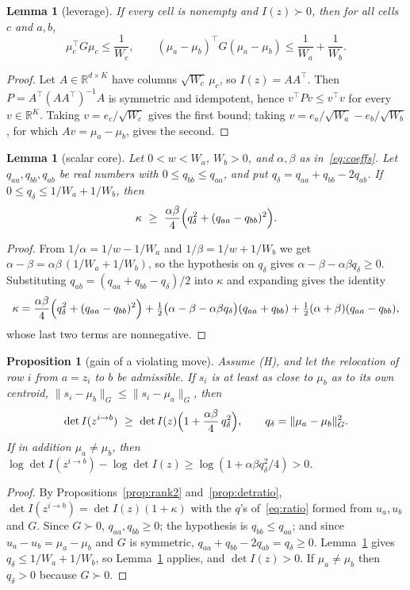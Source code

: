 \documentclass[11pt]{amsart}
\newtheorem{proposition}[theorem]{Proposition}
\newtheorem{lemma}[theorem]{Lemma}
\theoremstyle{definition}
\theoremstyle{remark}
\newcommand{\R}{\mathbb{R}}
\newcommand{\T}{^{\top}}
\newcommand{\Ib}{I(z)}
\begin{document}
\begin{lemma}[leverage]\label{lem:leverage}
If every cell is nonempty and $\Ib\succ0$, then for all cells $c$ and $a,b$,
\[
\mu_c\T G\mu_c\le\frac1{W_c},\qquad (\mu_a-\mu_b)\T G(\mu_a-\mu_b)\le\frac1{W_a}+\frac1{W_b}.
\]
\end{lemma}

\begin{proof}
Let $A\in\R^{d\times K}$ have columns $\sqrt{W_c}\,\mu_c$, so $\Ib=AA\T$. Then
$P=A\T(AA\T)^{-1}A$ is symmetric and idempotent, hence $v\T Pv\le v\T v$ for every
$v\in\R^K$. Taking $v=e_c/\sqrt{W_c}$ gives the first bound; taking
$v=e_a/\sqrt{W_a}-e_b/\sqrt{W_b}$, for which $Av=\mu_a-\mu_b$, gives the second.
\end{proof}

\begin{lemma}[scalar core]\label{lem:scalar}
Let $0<w<W_a$, $W_b>0$, and $\alpha,\beta$ as in~\eqref{eq:coeffs}. Let $q_{aa},q_{bb},q_{ab}$
be real numbers with $0\le q_{bb}\le q_{aa}$, and put $q_\delta=q_{aa}+q_{bb}-2q_{ab}$. If
$0\le q_\delta\le 1/W_a+1/W_b$, then
\[
\kappa\ \ge\ \frac{\alpha\beta}{4}\Bigl(q_\delta^2+(q_{aa}-q_{bb})^2\Bigr).
\]
\end{lemma}

\begin{proof}
From $1/\alpha=1/w-1/W_a$ and $1/\beta=1/w+1/W_b$ we get
$\alpha-\beta=\alpha\beta\,(1/W_a+1/W_b)$, so the hypothesis on $q_\delta$ gives
$\alpha-\beta-\alpha\beta q_\delta\ge0$. Substituting $q_{ab}=(q_{aa}+q_{bb}-q_\delta)/2$ into
$\kappa$ and expanding gives the identity
\[
\kappa=\frac{\alpha\beta}{4}\Bigl(q_\delta^2+(q_{aa}-q_{bb})^2\Bigr)
+\tfrac12\bigl(\alpha-\beta-\alpha\beta q_\delta\bigr)(q_{aa}+q_{bb})
+\tfrac12(\alpha+\beta)(q_{aa}-q_{bb}),
\]
whose last two terms are nonnegative.
\end{proof}

\begin{proposition}[gain of a violating move]\label{prop:gain}
Assume (H), and let the relocation of row $i$ from $a=z_i$ to $b$ be admissible. If $s_i$ is at
least as close to $\mu_b$ as to its own centroid,
$\|s_i-\mu_b\|_G\le\|s_i-\mu_a\|_G$, then
\[
\det I(z^{i\to b})\ \ge\ \det\Ib\Bigl(1+\frac{\alpha\beta}{4}\,q_\delta^2\Bigr),\qquad
q_\delta=\|\mu_a-\mu_b\|_G^2 .
\]
If in addition $\mu_a\ne\mu_b$, then $\log\det I(z^{i\to b})-\log\det\Ib\ge
\log(1+\alpha\beta q_\delta^2/4)>0$.
\end{proposition}

\begin{proof}
By Propositions~\ref{prop:rank2} and~\ref{prop:detratio}, $\det I(z^{i\to b})=\det\Ib(1+\kappa)$ with
the $q$'s of~\eqref{eq:ratio} formed from $u_a,u_b$ and $G$. Since $G\succ0$, $q_{aa},q_{bb}\ge0$;
the hypothesis is $q_{bb}\le q_{aa}$; and since $u_a-u_b=\mu_a-\mu_b$ and $G$ is symmetric,
$q_{aa}+q_{bb}-2q_{ab}=q_\delta\ge0$. Lemma~\ref{lem:leverage} gives
$q_\delta\le1/W_a+1/W_b$, so Lemma~\ref{lem:scalar} applies, and $\det\Ib>0$. If
$\mu_a\ne\mu_b$ then $q_\delta>0$ because $G\succ0$.
\end{proof}
\end{document}
